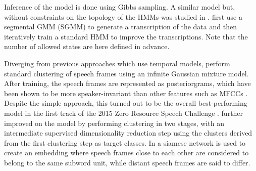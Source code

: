 Inference of the model is done using Gibbs sampling.
A similar model but, without constraints on the topology of the HMMs was studied in \parencite{gs:VanhainenAndSalvi2014ICASSP}.
\textcite{siu2014unsupervised} first use a segmental GMM (SGMM) to generate a transcription of the data and then iteratively train a standard HMM to improve the transcriptions. %
Note that the number of allowed states are here defined in advance.

Diverging from previous approaches which use temporal models, \textcite{chen2015parallel} perform standard clustering of speech frames using an infinite Gaussian mixture model.
After training, the speech frames are represented as posteriorgrams, which have been shown to be more speaker-invariant than other features such as MFCCs \parencite{zhang2010towards}.
Despite the simple approach, this turned out to be the overall best-performing model in the first track of the 2015 Zero Resource Speech Challenge \parencite{versteegh2016zero}.
\textcite{heck2016unsupervised} further improved on the model by performing clustering in two stages, with an intermediate supervised dimensionality reduction step using the clusters derived from the first clustering step as target classes.
In \parencite{synnaeve2016temporal} a siamese network \parencite{bromley1994signature} is used to create an embedding where speech frames close to each other are considered to belong to the same subword unit, while distant speech frames are said to differ.

